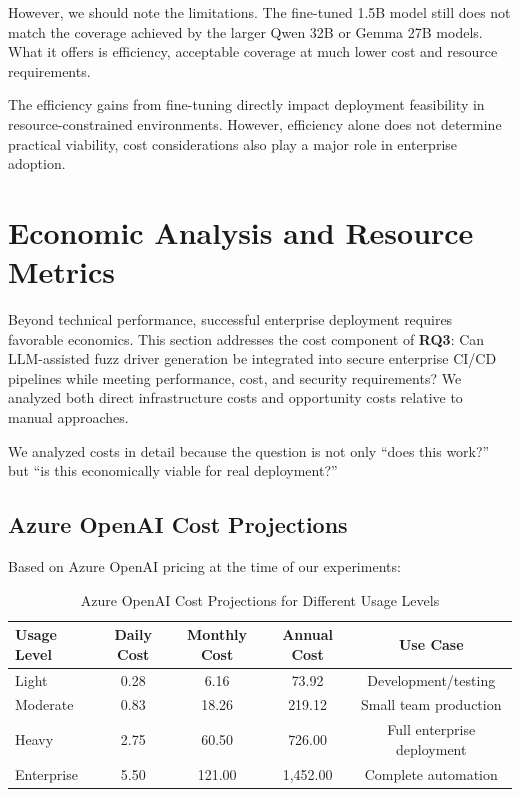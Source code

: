 However, we should note the limitations. The fine-tuned 1.5B model still does not match the coverage achieved by the larger Qwen 32B or Gemma 27B models. What it offers is efficiency, acceptable coverage at much lower cost and resource requirements.

The efficiency gains from fine-tuning directly impact deployment feasibility in resource-constrained environments. However, efficiency alone does not determine practical viability, cost considerations also play a major role in enterprise adoption.


\section{Economic Analysis and Resource Metrics}
\label{sec:results_economics}

Beyond technical performance, successful enterprise deployment requires favorable economics. This section addresses the cost component of \textbf{RQ3}: Can LLM-assisted fuzz driver generation be integrated into secure enterprise CI/CD pipelines while meeting performance, cost, and security requirements? We analyzed both direct infrastructure costs and opportunity costs relative to manual approaches.

We analyzed costs in detail because the question is not only ``does this work?'' but ``is this economically viable for real deployment?''

\subsection{Azure OpenAI Cost Projections}
\label{sec:results_cost_azure}

Based on Azure OpenAI pricing at the time of our experiments:

\begin{table}[htbp]
\centering
\caption{Azure OpenAI Cost Projections for Different Usage Levels}
\label{tab:cost_scenarios}
\small
\begin{tabular}{lcccc}
\toprule
Usage Level & Daily Cost & Monthly Cost & Annual Cost & Use Case \\
\midrule
Light & \texteuro{}0.28 & \texteuro{}6.16 & \texteuro{}73.92 & Development/testing \\
Moderate & \texteuro{}0.83 & \texteuro{}18.26 & \texteuro{}219.12 & Small team production \\
Heavy & \texteuro{}2.75 & \texteuro{}60.50 & \texteuro{}726.00 & Full enterprise deployment \\
Enterprise & \texteuro{}5.50 & \texteuro{}121.00 & \texteuro{}1,452.00 & Complete automation \\
\bottomrule
\end{tabular}
\end{table}

